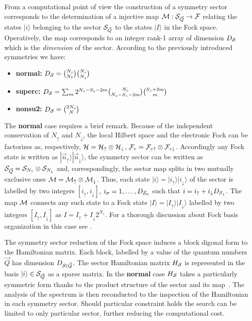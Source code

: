 \documentclass[final,3p,10pt]{elsarticle}
\newcommand{\onlinecite}[1]{\nocite{#1}\hspace{-0.1cm}\citenum{#1}}
\newcommand{\ket}[1]
{|#1\rangle}
\def\up{\uparrow} \def\down{\downarrow} \def\dw{\downarrow}
\begin{document}
From a computational point of view the construction of a symmetry
sector corresponds to the determination of a injective map
${\cal M}:{\cal S}_{\vec{Q}}\rightarrow {\cal F}$ relating the states $\ket{i}$
belonging to the sector ${\cal S}_{\vec{Q}}$ to the states $\ket{I}$ in the
Fock space. Operatively, the map corresponds to an integer rank-1
array of dimension $D_{\cal S}$ which is the {\it dimension} of the
sector. According to the previously introduced symmetries we
have:
\begin{itemize}
\item{\bf normal:}  $D_\SS = \binom{N_s}{N_\up}\binom{N_s}{N_\dw}$ 
\item{\bf superc:}  $D_{\cal S} = \sum_m 2^{N_s-S_z-2m}\binom{N_s}{N_s-S_z-2m}\binom{S_z+2m}{m}$
\item{\bf nonsu2:} $D_{\cal S}=\binom{2N_s}{N}$
\end{itemize}

The {\bf normal} case requires a brief remark. Because of the
independent conservation of $N_\up$ and $N_\dw$, the local Hilbert
space and the electronic Fock can be factorizes as, respectively,
$\HH=\HH_\up\otimes\HH_\dw$, $\FF_e = \FF_{e\up}\otimes \FF_{e\dw}$.  
Accordingly any Fock state is written as $\ket{\vec{n}_\up}\ket{\vec{n}_\dw}$, the symmetry sector can be written as  $\SS_{\vec{Q}} = \SS_{N_\up}\otimes
\SS_{N_\dw}$ and, correspondingly, the sector map splits in two
mutually exclusive ones $\MM = \MM_\up
\otimes \MM_\dw$.
Thus, each state $\ket{i}=\ket{i_\up}\ket{i_\dw}$ of the
sector is labelled by two integers $[i_\up,i_\dw]$, 
$i_\sigma=1,\dots,D_{{\cal S}_\sigma}$ such that $i=i_\up + i_\dw
D_{\SS_\dw}$. The map ${\cal M}$ connects any such state to a Fock state
$\ket{I}=\ket{I_\up}\ket{I_\dw}$ labelled by two integers
$[I_\up,I_\dw]$ as $I=I_\up +   I_\dw 2^{N_s}$. For a thorough
discussion about Fock basis organization in this case see
\onlinecite{amaricci2022}. 

The symmetry sector reduction of the Fock space induces a block
digonal form to the Hamiltonian matrix. Each block, labelled by a
value of the quantum numbers $\vec{Q}$ has dimension
$D_{{\cal S}(\vec{Q}}$. The sector Hamiltonian matrix $H_{\cal S}$ is represented in the
basis $\ket{i}\in\SS_{\vec{Q}}$ as a sparse matrix. In the {\bf
  normal} case $H_{\cal S}$ takes a particularly symmetric form thanks to
the product structure of the sector and its map~\cite{amaricci2022}.
The analysis of the spectrum is then reconducted to the inspection of
the Hamiltonian in each symmetry sector. Should particular constraint
holds the search can be limited to only particular sector, further
reducing the computational cost. 
\end{document}
